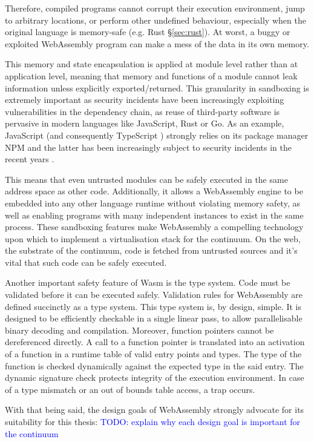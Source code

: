 Therefore, compiled programs cannot corrupt their execution environment, jump to arbitrary locations, or perform other undefined behaviour, especially when the original language is memory-safe (e.g. Rust §\ref{sec:rust}). At worst, a buggy or exploited WebAssembly program can make a mess of the data in its own memory.

This memory and state encapsulation is applied at module level rather than at application level, meaning that memory and functions of a module cannot leak information unless explicitly exported/returned. This granularity in sandboxing is extremely important as security incidents have been increasingly exploiting vulnerabilities in the dependency chain, as reuse of third-party software is pervasive in modern languages like JavaScript, Rust or Go. As an example, JavaScript (and consequently TypeScript \cite{typescript}) strongly relies on its package manager NPM and the latter has been increasingly subject to security incidents in the recent years \cite{npm-security}.

This means that even untrusted modules can be safely executed in the same address space as other code. Additionally, it allows a WebAssembly engine to be embedded into any other language runtime without violating memory safety, as well as enabling programs with many independent instances to exist in the same process. These sandboxing features make WebAssembly a compelling technology upon which to implement a virtualisation stack for the continuum. On the web, the substrate of the continuum, code is fetched from untrusted sources and it's vital that such code can be safely executed.

Another important safety feature of Wasm is the type system. Code must be validated before it can be executed safely. Validation rules for WebAssembly are defined succinctly as a type system. This type system is, by design, simple. It is designed to be efficiently checkable in a single linear pass, to allow parallelisable binary decoding and compilation. Moreover, function pointers cannot be dereferenced directly. A call to a function pointer is translated into an activation of a function in a runtime table of valid entry points and types. The type of the function is checked dynamically against the expected type in the said entry. The dynamic signature check protects integrity of the execution environment. In case of a type mismatch or an out of bounds table access, a trap occurs.

With that being said, the design goals of WebAssembly strongly advocate for its suitability for this thesis: \textcolor{blue}{TODO: explain why each design goal is important for the continuum}


